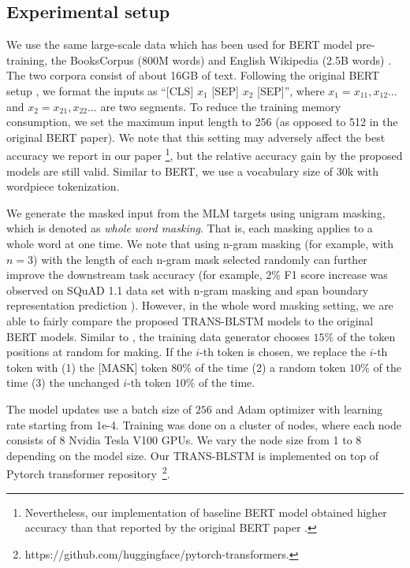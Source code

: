 \documentclass[11pt,a4paper]{article}
\begin{document}
\subsection{Experimental setup}

We use the same large-scale data which has been used for BERT model pre-training, the BooksCorpus (800M words) \cite{zhu2015} and English Wikipedia (2.5B words) \cite{wiki2004,devlin2018}. The two corpora consist of about 16GB of text. Following the original BERT setup \cite{devlin2018}, we format the inputs as ``[CLS] $x_1$ [SEP] $x_2$ [SEP]'', where $x_1 = x_{11}, x_{12} \ldots$ and $x_2 = x_{21}, x_{22} \ldots$ are two segments. To reduce the training memory consumption, we set the maximum input length to 256 (as opposed to 512 in the original BERT paper). We note that this setting may adversely affect the best accuracy we report in our paper \footnote{Nevertheless, our implementation of baseline BERT model obtained higher accuracy than that reported by the original BERT paper \cite{devlin2018}.}, but the relative accuracy gain by the proposed models are still valid. Similar to BERT, we use a vocabulary size of 30k with wordpiece tokenization. 

We generate the masked input from the MLM targets using unigram masking, which is denoted as \textit{whole word masking}. That is, each masking applies to a whole word at one time. We note that using n-gram masking (for example, with $n=3$) \cite{joshi2019,lan2019} with the length of each n-gram mask selected randomly can further improve the downstream task accuracy (for example, $2\%$ F1 score increase was observed on SQuAD 1.1 data set with n-gram masking and span boundary representation prediction \cite{joshi2019}). However, in the whole word masking setting, we are able to fairly compare the proposed TRANS-BLSTM models to the original BERT models. Similar to \cite{devlin2018}, the training data generator chooses $15\%$ of the token positions at random for making. If the $i$-th token is chosen, we replace the $i$-th token with (1) the [MASK] token $80\%$ of the time (2) a random token $10\%$ of the time (3) the unchanged $i$-th token $10\%$ of the time. 

The model updates use a batch size of $256$ and Adam optimizer with learning rate starting from 1e-4. Training was done on a cluster of nodes, where each node consists of 8 Nvidia Tesla V100 GPUs. We vary the node size from 1 to 8 depending on the model size. Our TRANS-BLSTM is implemented on top of Pytorch transformer repository~\footnote{https://github.com/huggingface/pytorch-transformers.}. 
\end{document}
